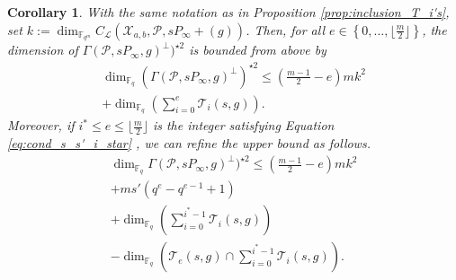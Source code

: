 \documentclass[lettersize,journal]{IEEEtran}
\theoremstyle{plain}
\newtheorem{coro}[thm]{Corollary}
\theoremstyle{definition}
\theoremstyle{remark}
\newcommand{\calP}{\mathcal{P}}
\newcommand{\calL}{\mathcal{L}}
\newcommand{\calT}{\mathcal{T}}
\newcommand{\calX}{\mathcal{X}}
\newcommand{\fqm}{\mathbb{F}_{q^m}}
\newcommand{\fq}{\mathbb{F}_{q}}
\newcommand{\set}[1]{\left\{#1\right\}}
\begin{document}
	\begin{coro} \label{coro:folklore_upper_bound}
		With the same notation as in Proposition \ref{prop:inclusion_T_i's}, set $k:=\dim_{\fqm}C_{\calL}(\calX_{a,b},\calP,sP_\infty+(g))$.
		Then, for all $e \in \set{0,\dots,\lfloor \frac{m}{2} \rfloor}$, the dimension of $\Gamma(\calP,sP_\infty,g)^{\perp})^{\star 2}$ is bounded from above by
		\begin{multline}
		\dim_{\fq} \left(\Gamma(\calP,sP_\infty,g)^{\perp}\right)^{\star 2} \leq   \left(\frac{m-1}{2}-e\right)mk^2 \\+\dim_{\fq}\left(\sum\limits_{i=0}^e \calT_i(s,g) \right).
	\end{multline}
		Moreover, if $i^* \leq e \leq \lfloor \frac{m}{2} \rfloor$ is the integer satisfying Equation \eqref{eq:cond_s_s'_i_star} , we can refine the upper bound as follows. 
		\begin{multline}
			\dim_{\fq} \Gamma(\calP,sP_\infty,g)^{\perp})^{\star 2} \leq  \left(\frac{m-1}{2}-e\right)mk^2 \\ + ms'(q^e-q^{e-1}+1) 
			\\+ \dim_{\fq}\left(\sum\limits_{i=0}^{i^*-1} \calT_i(s,g)\right) \\- \dim_{\fq} \left( \calT_e(s,g) \cap   \sum\limits_{i=0}^{i^*-1} \calT_i(s,g)\right).
		\end{multline}
		
	\end{coro}
	
\end{document}
